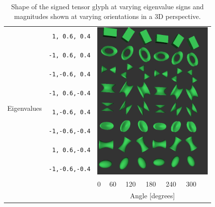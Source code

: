 \documentclass{InsightArticle}
\begin{document}
%
%

\renewcommand{\arraystretch}{2.09}
\begin{table}[ht]
  \begin{tabular}{cc p{0.01cm}p{0.4cm}p{0.5cm}p{0.5cm}p{0.5cm}p{0.5cm}p{0.5cm}}
    \hline
    \multirow{9}{*}{Eigenvalues}
    &\texttt{ 1, 0.6, 0.4}&\multicolumn{7}{l}{\multirow{8}{*}{\includegraphics[width=6cm]{SignedEigenvalueTensorGlyphMatrix}}} \\
    &\texttt{-1, 0.6, 0.4}& & & & & & & \\
    &\texttt{-1,-0.6, 0.4}& & & & & & & \\
    &\texttt{-1, 0.6,-0.4}& & & & & & & \\
    &\texttt{ 1,-0.6, 0.4}& & & & & & & \\
    &\texttt{-1,-0.6,-0.4}& & & & & & & \\
    &\texttt{ 1, 0.6,-0.4}& & & & & & & \\
    &\texttt{-1,-0.6,-0.4}& & & & & & & \\
    \hline
    \multicolumn{2}{c}{}& & 0 & 60 & 120 & 180 & 240 & 300 \\ [-1.1em]
    \multicolumn{2}{c}{}& \multicolumn{7}{c}{Angle [degrees]} \\
    \cline{3-9}
  \end{tabular}
  \caption{Shape of the signed tensor glyph at varying eigenvalue signs and
  magnitudes shown at varying orientations in a 3D perspective.}
  \label{tab:signed-flavors}
\end{table}
\end{document}
